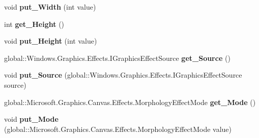\begin{DoxyCompactItemize}
void {\bfseries put\+\_\+\+Width} (int value)
\item 
\mbox{\label{interface_microsoft_1_1_graphics_1_1_canvas_1_1_effects_1_1_i_morphology_effect_a894c0a79c2bf5a0314930c5c502a7662}} 
int {\bfseries get\+\_\+\+Height} ()
\item 
\mbox{\label{interface_microsoft_1_1_graphics_1_1_canvas_1_1_effects_1_1_i_morphology_effect_aefc8baeb4576bca214b2862f5b188ff8}} 
void {\bfseries put\+\_\+\+Height} (int value)
\item 
\mbox{\label{interface_microsoft_1_1_graphics_1_1_canvas_1_1_effects_1_1_i_morphology_effect_ac0ce4230c50de3053b0200c3868607d6}} 
global\+::\+Windows.\+Graphics.\+Effects.\+I\+Graphics\+Effect\+Source {\bfseries get\+\_\+\+Source} ()
\item 
\mbox{\label{interface_microsoft_1_1_graphics_1_1_canvas_1_1_effects_1_1_i_morphology_effect_a6aba3568850c2df11ccf1005f5ecfbca}} 
void {\bfseries put\+\_\+\+Source} (global\+::\+Windows.\+Graphics.\+Effects.\+I\+Graphics\+Effect\+Source source)
\item 
\mbox{\label{interface_microsoft_1_1_graphics_1_1_canvas_1_1_effects_1_1_i_morphology_effect_a4625903e2e2033038f140f494007ccef}} 
global\+::\+Microsoft.\+Graphics.\+Canvas.\+Effects.\+Morphology\+Effect\+Mode {\bfseries get\+\_\+\+Mode} ()
\item 
\mbox{\label{interface_microsoft_1_1_graphics_1_1_canvas_1_1_effects_1_1_i_morphology_effect_ae67e959972393bca5d6e02aa06cd227b}} 
void {\bfseries put\+\_\+\+Mode} (global\+::\+Microsoft.\+Graphics.\+Canvas.\+Effects.\+Morphology\+Effect\+Mode value)
\item 
\mbox{\label{interface_microsoft_1_1_graphics_1_1_canvas_1_1_effects_1_1_i_morphology_effect_a30eb746728372b5fdd4c6e783b9a3545}} 

\end{DoxyCompactItemize}
